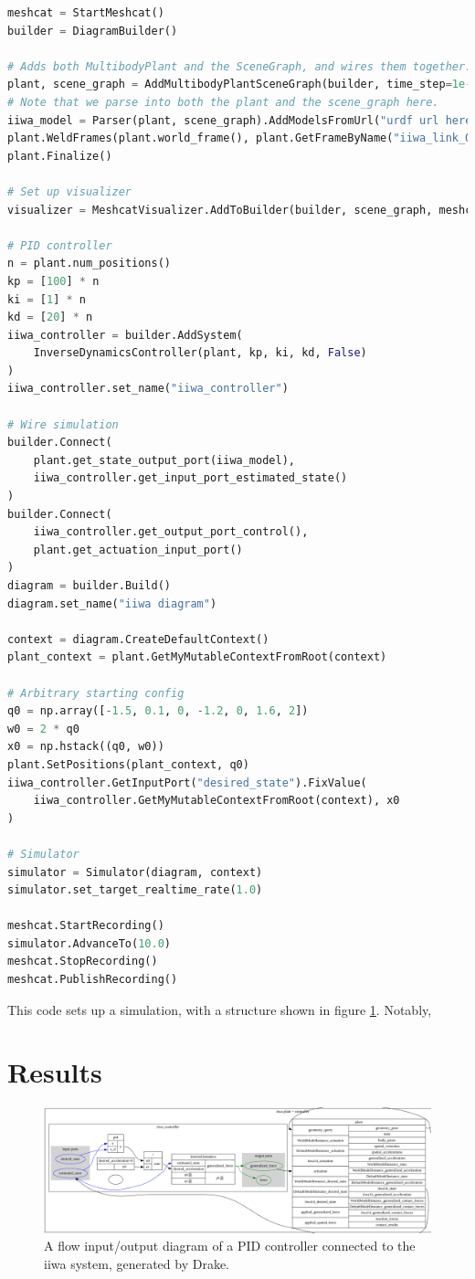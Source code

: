 \documentclass[11pt, titlepage]{article}
\begin{document}
\begin{lstlisting}[language=Python]
meshcat = StartMeshcat()
builder = DiagramBuilder()

# Adds both MultibodyPlant and the SceneGraph, and wires them together.
plant, scene_graph = AddMultibodyPlantSceneGraph(builder, time_step=1e-4)
# Note that we parse into both the plant and the scene_graph here.
iiwa_model = Parser(plant, scene_graph).AddModelsFromUrl("urdf url here")[0]
plant.WeldFrames(plant.world_frame(), plant.GetFrameByName("iiwa_link_0"))
plant.Finalize()

# Set up visualizer
visualizer = MeshcatVisualizer.AddToBuilder(builder, scene_graph, meshcat)

# PID controller
n = plant.num_positions()
kp = [100] * n
ki = [1] * n
kd = [20] * n
iiwa_controller = builder.AddSystem(
    InverseDynamicsController(plant, kp, ki, kd, False)
)
iiwa_controller.set_name("iiwa_controller")

# Wire simulation
builder.Connect(
    plant.get_state_output_port(iiwa_model),
    iiwa_controller.get_input_port_estimated_state()
)
builder.Connect(
    iiwa_controller.get_output_port_control(),
    plant.get_actuation_input_port()
)
diagram = builder.Build()
diagram.set_name("iiwa diagram")

context = diagram.CreateDefaultContext()
plant_context = plant.GetMyMutableContextFromRoot(context)

# Arbitrary starting config
q0 = np.array([-1.5, 0.1, 0, -1.2, 0, 1.6, 2])
w0 = 2 * q0
x0 = np.hstack((q0, w0))
plant.SetPositions(plant_context, q0)
iiwa_controller.GetInputPort("desired_state").FixValue(
    iiwa_controller.GetMyMutableContextFromRoot(context), x0
)

# Simulator
simulator = Simulator(diagram, context)
simulator.set_target_realtime_rate(1.0)

meshcat.StartRecording()
simulator.AdvanceTo(10.0)
meshcat.StopRecording()
meshcat.PublishRecording()

\end{lstlisting}

This code sets up a simulation, with a structure shown in figure \ref{fig:diagram}. Notably,

\section{Results}

\begin{figure}[hbt!]
\centering
\includegraphics[width=1\linewidth]{diagram.png}
\caption{\label{fig:diagram}A flow input/output diagram of a PID controller connected to the iiwa system, generated by Drake.}
\end{figure}
\end{document}
